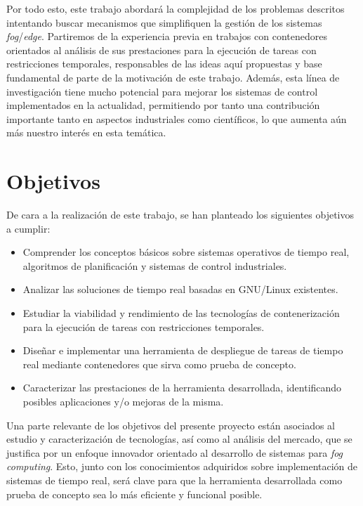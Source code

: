 Por todo esto, este trabajo abordará la complejidad de los problemas descritos
intentando buscar mecanismos que simplifiquen la gestión de los sistemas
\textit{fog}/\textit{edge}. Partiremos de la experiencia previa en trabajos con
contenedores orientados al análisis de sus prestaciones para la ejecución de
tareas con restricciones temporales, responsables de las ideas aquí propuestas y
base fundamental de parte de la motivación de este trabajo. Además, esta línea
de investigación tiene mucho potencial para mejorar los sistemas de control
implementados en la actualidad, permitiendo por tanto una contribución
importante tanto en aspectos industriales como científicos, lo que aumenta aún
más nuestro interés en esta temática.

\section{Objetivos}

De cara a la realización de este trabajo, se han planteado los siguientes
objetivos a cumplir:

\begin{itemize}
      \item Comprender los conceptos básicos sobre sistemas operativos de tiempo
            real, algoritmos de planificación y sistemas de control industriales.
      \item Analizar las soluciones de tiempo real basadas en GNU/Linux existentes.
      \item Estudiar la viabilidad y rendimiento de las tecnologías de
            contenerización para la ejecución de tareas con restricciones temporales.
      \item Diseñar e implementar una herramienta de despliegue de tareas de
            tiempo real mediante contenedores que sirva como prueba de concepto.
      \item Caracterizar las prestaciones de la herramienta desarrollada,
            identificando posibles aplicaciones y/o mejoras de la misma.
\end{itemize}

Una parte relevante de los objetivos del presente proyecto están asociados al
estudio y caracterización de tecnologías, así como al análisis del mercado, que
se justifica por un enfoque innovador orientado al desarrollo de sistemas para
\textit{fog computing}. Esto, junto con los conocimientos adquiridos sobre
implementación de sistemas de tiempo real, será clave para que la herramienta
desarrollada como prueba de concepto sea lo más eficiente y funcional posible.

